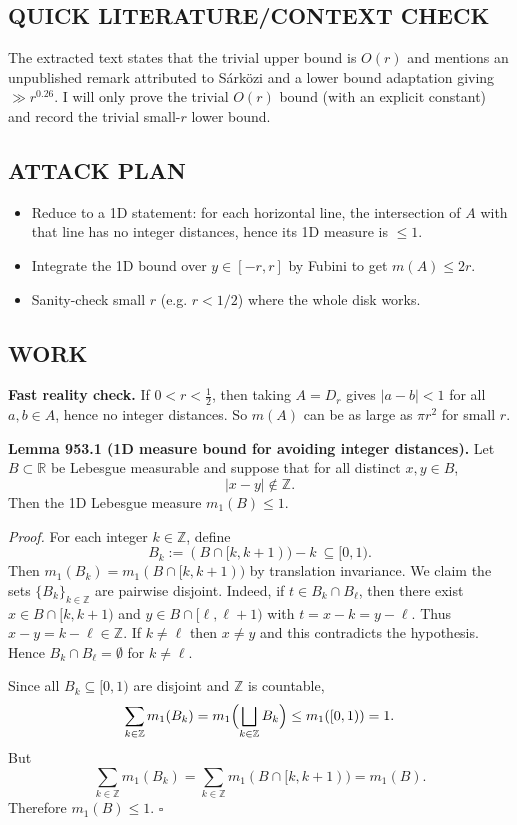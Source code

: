 \subsection*{QUICK LITERATURE/CONTEXT CHECK}
The extracted text states that the trivial upper bound is $O(r)$ and mentions an unpublished remark attributed to S\'ark\"{o}zi and a lower bound adaptation giving $\gg r^{0.26}$.
I will only prove the trivial $O(r)$ bound (with an explicit constant) and record the trivial small-$r$ lower bound.

\subsection*{ATTACK PLAN}
\begin{itemize}
\item Reduce to a 1D statement: for each horizontal line, the intersection of $A$ with that line has no integer distances, hence its 1D measure is $\le 1$.
\item Integrate the 1D bound over $y\in[-r,r]$ by Fubini to get $m(A)\le 2r$.
\item Sanity-check small $r$ (e.g. $r<1/2$) where the whole disk works.
\end{itemize}

\subsection*{WORK}
\noindent\textbf{Fast reality check.}
If $0<r<\tfrac12$, then taking $A=D_r$ gives $|a-b|<1$ for all $a,b\in A$, hence no integer distances. So $m(A)$ can be as large as $\pi r^2$ for small $r$.

\medskip
\noindent\textbf{Lemma 953.1 (1D measure bound for avoiding integer distances).}
Let $B\subset\mathbb R$ be Lebesgue measurable and suppose that for all distinct $x,y\in B$,
\[|x-y|\notin\mathbb Z.\]
Then the 1D Lebesgue measure $m_1(B)\le 1$.

\medskip
\noindent\emph{Proof.}
For each integer $k\in\mathbb Z$, define
\[
B_k := (B\cap [k,k+1)) - k \ \subseteq [0,1).
\]
Then $m_1(B_k)=m_1(B\cap [k,k+1))$ by translation invariance.
We claim the sets $\{B_k\}_{k\in\mathbb Z}$ are pairwise disjoint.
Indeed, if $t\in B_k\cap B_\ell$, then there exist $x\in B\cap[k,k+1)$ and $y\in B\cap[\ell,\ell+1)$ with $t=x-k=y-\ell$.
Thus $x-y=k-\ell\in\mathbb Z$.
If $k\ne \ell$ then $x\ne y$ and this contradicts the hypothesis.
Hence $B_k\cap B_\ell=\emptyset$ for $k\ne\ell$.

Since all $B_k\subseteq[0,1)$ are disjoint and $\mathbb Z$ is countable,
\[
\sum_{k\in\mathbb Z} m_1(B_k)= m_1\Bigl(\bigsqcup_{k\in\mathbb Z} B_k\Bigr)\le m_1([0,1))=1.
\]
But
\[
\sum_{k\in\mathbb Z} m_1(B_k)=\sum_{k\in\mathbb Z} m_1(B\cap[k,k+1))=m_1(B).
\]
Therefore $m_1(B)\le1$.
\hfill $\square$

